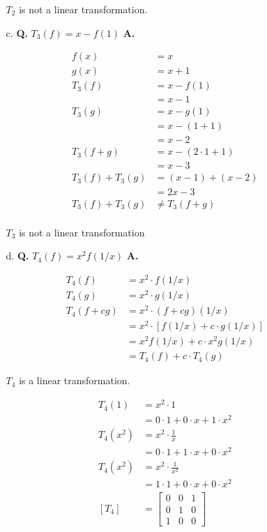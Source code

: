 \documentclass[main.tex]{subfiles}
\begin{document}
\begin{enumerate}
\begin{enumerate}
    $T_{2}$ is not a linear transformation.
    
    \item [c.] \textbf{Q.} $T_{3}(f)=x-f(1)$
    \textbf{A.}

    $$
    \begin{aligned}
    f(x) &= x\\
    g(x) &= x+1\\
    T_{3}(f) &= x-f(1)\\
    &=x-1\\
    T_{3}(g) &= x-g(1)\\
    &=x-(1+1)\\
    &=x-2\\
    T_{3}(f+g) &= x-(2 \cdot 1+1)\\
    &=x-3\\
    T_{3}(f)+T_{3}(g)&=(x-1)+(x-2)\\
    &=2 x-3\\
    T_{3}(f)+T_{3}(g) &\neq T_{3}(f+g)\\
    \end{aligned}
    $$

    $T_{3}$ is not a linear transformation
    
    \item [d.] \textbf{Q.} $T_{4}(f)=x^{2} f(1 / x)$
    \textbf{A.}

    $$
    \begin{aligned}
    T_{4}(f) &= x^{2} \cdot f(1 / x)\\
    T_{4}(g) &= x^{2} \cdot g(1 / x) \\
    T_{4}(f + cg) &= x^{2} \cdot(f+c g)(1 / x) \\
    &=x^{2} \cdot[f(1 / x)+c \cdot g(1 / x)] \\
    &=x^{2} f(1 / x)+c \cdot x^{2} g(1 / x) \\
    &=T_{4}(f)+c \cdot T_{4}(g)
    \end{aligned}
    $$

    $T_4$ is a linear transformation.

    $$
    \begin{aligned}
    T_{4}(1) &= x^{2} \cdot 1\\
    &= 0 \cdot 1+0 \cdot x+1 \cdot x^{2} \\
    T_{4}\left(x^{2}\right) &= x^{2} \cdot \frac{1}{x}\\
    &= 0 \cdot 1+1 \cdot x+0 \cdot x^{2} \\
    T_{4}\left(x^{2}\right) &= x^{2} \cdot \frac{1}{x^{2}}\\
    &= 1 \cdot 1+0 \cdot x+0 \cdot x^{2} \\
    \left[T_{4}\right]&=\left[\begin{array}{lll}
    0 & 0 & 1 \\
    0 & 1 & 0 \\
    1 & 0 & 0
    \end{array}\right]
    \end{aligned}
    $$


\end{enumerate}
\end{enumerate}
\end{document}
